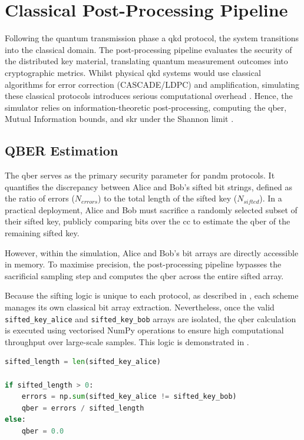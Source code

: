 \newpage
\section{Classical Post-Processing Pipeline}
\label{sec:postprocessing}

Following the quantum transmission phase a \gls{qkd} protocol, the system transitions into the classical domain. The post-processing pipeline evaluates the security of the distributed key material, translating quantum measurement outcomes into cryptographic metrics. Whilst physical \gls{qkd} systems would use classical algorithms for error correction (CASCADE/LDPC) and \gls{amplification}, simulating these classical protocols introduces serious computational overhead \cite{Cascade1994}. Hence, the simulator relies on information-theoretic post-processing, computing the \gls{qber}, Mutual Information bounds, and \gls{skr} under the Shannon limit \cite{Shannon1948}.

\subsection{QBER Estimation}
\label{subsec:QBER}

The \gls{qber} serves as the primary security parameter for \gls{pandm} protocols. It quantifies the discrepancy between Alice and Bob's sifted bit strings, defined as the ratio of errors ($N_{errors}$) to the total length of the sifted key ($N_{sifted}$). In a practical deployment, Alice and Bob must sacrifice a randomly selected subset of their sifted key, publicly comparing bits over the \gls{cc} to estimate the \gls{qber} of the remaining sifted key.

However, within the simulation, Alice and Bob's bit arrays are directly accessible in memory. To maximise precision, the post-processing pipeline bypasses the sacrificial sampling step and computes the \gls{qber} across the entire sifted array.

Because the \gls{sifting} logic is unique to each protocol, as described in , each scheme manages its own classical bit array extraction. Nevertheless, once the valid \texttt{sifted\_key\_alice} and \texttt{sifted\_key\_bob} arrays are isolated, the \gls{qber} calculation is executed using vectorised NumPy operations to ensure high computational throughput over large-scale samples. This logic is demonstrated in .

\begin{lstlisting}[language=Python, caption={Vectorised QBER Calculation Logic.}, label={lst:qber_calc}]
sifted_length = len(sifted_key_alice)

if sifted_length > 0:
    errors = np.sum(sifted_key_alice != sifted_key_bob)
    qber = errors / sifted_length
else:
    qber = 0.0
\end{lstlisting}

